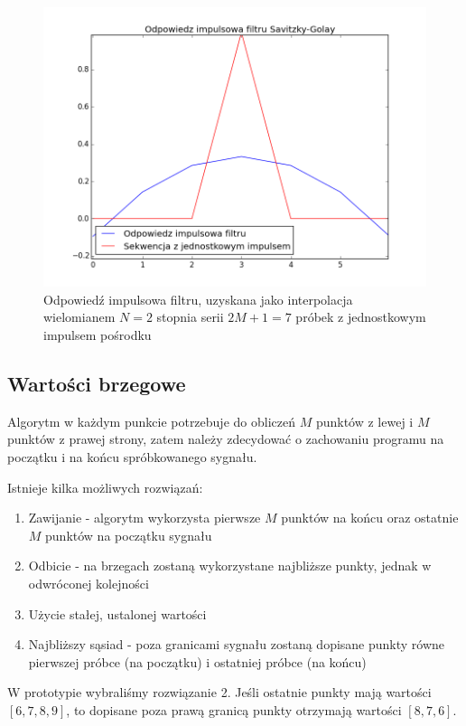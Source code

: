 \begin{figure}[!htb]
  \begin{center}
    \includegraphics[scale=0.8]
    {img/impulse.png}
  \end{center}
  \caption{Odpowiedź impulsowa filtru, uzyskana jako interpolacja wielomianem $N=2$ stopnia serii $2M+1=7$ próbek z jednostkowym impulsem pośrodku}
  \label{rys:impuls}
\end{figure}

\subsection{Wartości brzegowe}
Algorytm w każdym punkcie potrzebuje do obliczeń $M$ punktów z lewej i $M$ punktów z prawej strony, zatem należy zdecydować o zachowaniu programu na początku i na końcu spróbkowanego sygnału.

Istnieje kilka możliwych rozwiązań:
\begin{enumerate}
\item Zawijanie - algorytm wykorzysta pierwsze $M$ punktów na końcu oraz ostatnie $M$ punktów na początku sygnału
\item Odbicie - na brzegach zostaną wykorzystane najbliższe punkty, jednak w odwróconej kolejności
\item Użycie stałej, ustalonej wartości
\item Najbliższy sąsiad - poza granicami sygnału zostaną dopisane punkty równe pierwszej próbce (na początku) i ostatniej próbce (na końcu)
\end{enumerate}

W prototypie wybraliśmy rozwiązanie 2. Jeśli ostatnie punkty mają wartości $[6, 7, 8, 9]$, to dopisane poza prawą granicą punkty otrzymają wartości $[8, 7, 6]$.


